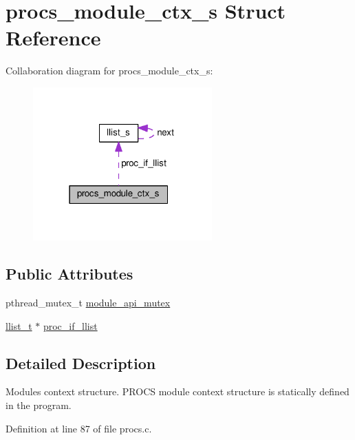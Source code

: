 \hypertarget{structprocs__module__ctx__s}{}\section{procs\+\_\+module\+\_\+ctx\+\_\+s Struct Reference}
\label{structprocs__module__ctx__s}


Collaboration diagram for procs\+\_\+module\+\_\+ctx\+\_\+s\+:\nopagebreak
\begin{figure}[H]
\begin{center}
\leavevmode
\includegraphics[width=195pt]{structprocs__module__ctx__s__coll__graph}
\end{center}
\end{figure}
\subsection*{Public Attributes}
\begin{DoxyCompactItemize}
\item 
pthread\+\_\+mutex\+\_\+t \hyperlink{structprocs__module__ctx__s_a10c3a0b462ead663af1b117abdfdadaa}{module\+\_\+api\+\_\+mutex}
\item 
\hyperlink{llist_8h_a90862badf6f9cc4e3d6348b7d60ce4f0}{llist\+\_\+t} $\ast$ \hyperlink{structprocs__module__ctx__s_a8a7a2cc3f2ee076ae11b7fdc63645f41}{proc\+\_\+if\+\_\+llist}
\end{DoxyCompactItemize}


\subsection{Detailed Description}
Module\textquotesingle{}s context structure. P\+R\+O\+CS module context structure is statically defined in the program. 

Definition at line 87 of file procs.\+c.




